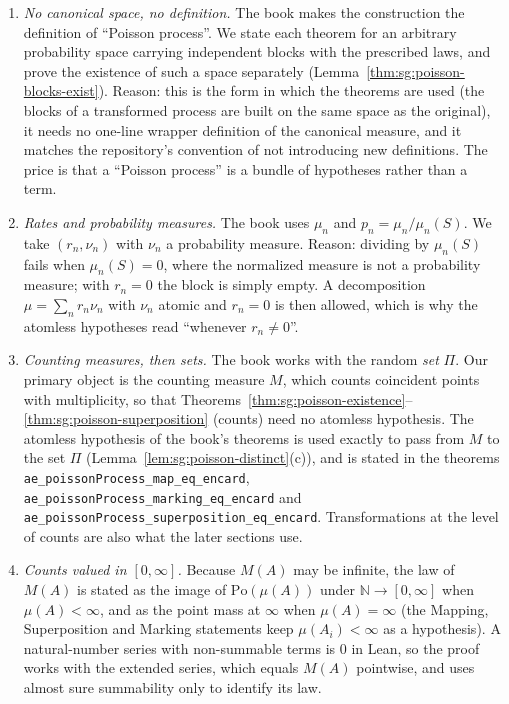 \begin{remark}\label{rem:sg:poisson-deviation}
\begin{enumerate}
\item \emph{No canonical space, no definition.} The book makes the construction the definition of ``Poisson process''. We state each theorem for an arbitrary probability space carrying independent blocks with the prescribed laws, and prove the existence of such a space separately (Lemma~\ref{thm:sg:poisson-blocks-exist}). Reason: this is the form in which the theorems are used (the blocks of a transformed process are built on the same space as the original), it needs no one-line wrapper definition of the canonical measure, and it matches the repository's convention of not introducing new definitions. The price is that a ``Poisson process'' is a bundle of hypotheses rather than a term.
\item \emph{Rates and probability measures.} The book uses $\mu_n$ and $p_n=\mu_n/\mu_n(S)$. We take $(r_n,\nu_n)$ with $\nu_n$ a probability measure. Reason: dividing by $\mu_n(S)$ fails when $\mu_n(S)=0$, where the normalized measure is not a probability measure; with $r_n=0$ the block is simply empty. A decomposition $\mu=\sum_nr_n\nu_n$ with $\nu_n$ atomic and $r_n=0$ is then allowed, which is why the atomless hypotheses read ``whenever $r_n\ne0$''.
\item \emph{Counting measures, then sets.} The book works with the random \emph{set} $\Pi$. Our primary object is the counting measure $M$, which counts coincident points with multiplicity, so that Theorems~\ref{thm:sg:poisson-existence}--\ref{thm:sg:poisson-superposition} (counts) need no atomless hypothesis. The atomless hypothesis of the book's theorems is used exactly to pass from $M$ to the set $\Pi$ (Lemma~\ref{lem:sg:poisson-distinct}(c)), and is stated in the theorems \texttt{ae\_poissonProcess\_map\_eq\_encard}, \texttt{ae\_poissonProcess\_marking\_eq\_encard} and \texttt{ae\_poissonProcess\_superposition\_eq\_encard}. Transformations at the level of counts are also what the later sections use.
\item \emph{Counts valued in $[0,\infty]$.} Because $M(A)$ may be infinite, the law of $M(A)$ is stated as the image of $\mathrm{Po}(\mu(A))$ under $\mathbb N\to[0,\infty]$ when $\mu(A)<\infty$, and as the point mass at $\infty$ when $\mu(A)=\infty$ (the Mapping, Superposition and Marking statements keep $\mu(A_i)<\infty$ as a hypothesis). A natural-number series with non-summable terms is $0$ in Lean, so the proof works with the extended series, which equals $M(A)$ pointwise, and uses almost sure summability only to identify its law.

\end{enumerate}
\end{remark}
